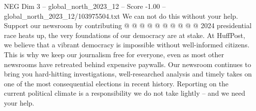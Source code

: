 \begin{textsample}{NEG Dim 3 – global\_north\_2023\_12 – Score -1.00 – global\_north\_2023\_12/103975504.txt}
We can not do this without your help.
Support our newsroom by contributing @ @ @ @ @ @ @ @ @ @ 2024 presidential race heats up, the very foundations of our democracy are at stake.
At HuffPost, we believe that a vibrant democracy is impossible without well-informed citizens.
This is why we keep our journalism free for everyone, even as most other newsrooms have retreated behind expensive paywalls.
Our newsroom continues to bring you hard-hitting investigations, well-researched analysis and timely takes on one of the most consequential elections in recent history.
Reporting on the current political climate is a responsibility we do not take lightly -- and we need your help.

\end{textsample}
